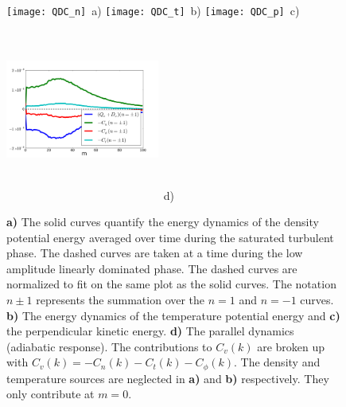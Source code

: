 \documentclass[12pt]{article}
\begin{document}
\begin{figure}
\texttt{[image: QDC\_n]}~a)
\hfil
\texttt{[image: QDC\_t]}~b)
\hfil
\texttt{[image: QDC\_p]}~c)
\hfil
\includegraphics[width=0.45\textwidth,height=60mm]{parallel_dynamics}~d)
\hfil
\caption{\textbf{a)} The solid curves quantify the energy dynamics of the density potential energy averaged over time during the saturated turbulent phase. The dashed curves are taken
at a time during the low amplitude linearly dominated phase. The dashed curves are normalized to fit on the same plot as the solid curves. The notation $n \pm 1$ represents the
summation over the $n=1$ and $n=-1$ curves. \textbf{b)} The energy dynamics of the temperature potential energy and \textbf{c)} the perpendicular kinetic energy. \textbf{d)} The parallel
dynamics (adiabatic response). The contributions to $C_v(k)$ are broken up with $C_v(k) = -C_n(k) - C_t(k) - C_\phi(k)$. The density and temperature sources are neglected in \textbf{a)}
and \textbf{b)} respectively. They only contribute at $m=0$.}
\label{nc_dynamics_figures}
\end{figure}
\end{document}
